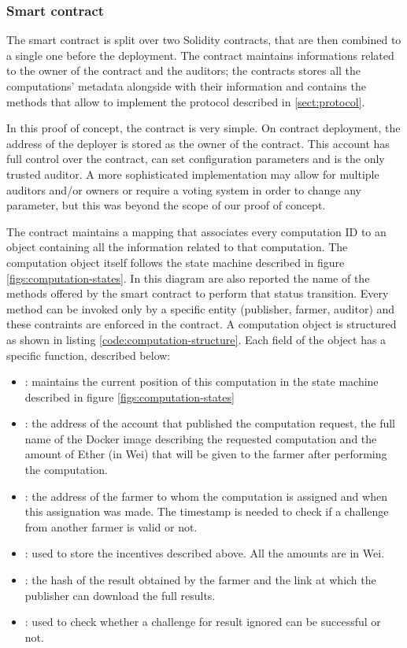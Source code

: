 \subsubsection{Smart contract}
The smart contract is split over two Solidity contracts, that are then combined to a single one before the deployment. The  contract maintains informations related to the owner of the contract and the auditors; the  contracts stores all the computations' metadata alongside with their information and contains the methods that allow to implement the protocol described in \ref{sect:protocol}.

In this proof of concept, the  contract is very simple. On contract deployment, the address of the deployer is stored as the owner of the contract. This account has full control over the contract, can set configuration parameters and is the only trusted auditor. A more sophisticated implementation may allow for multiple auditors and/or owners or require a voting system in order to change any parameter, but this was beyond the scope of our proof of concept.

The contract  maintains a mapping that associates every computation ID to an object containing all the information related to that computation. The computation object itself follows the state machine described in figure \ref{figs:computation-states}. In this diagram are also reported the name of the methods offered by the smart contract to perform that status transition. Every method can be invoked only by a specific entity (publisher, farmer, auditor) and these contraints are enforced in the contract. A computation object is structured as shown in listing \ref{code:computation-structure}. Each field of the object has a specific function, described below:

\begin{itemize}
\item {}: maintains the current position of this computation in the state machine described in figure \ref{figs:computation-states}
\item {}: the address of the account that published the computation request, the full name of the Docker image describing the requested computation and the amount of Ether (in Wei) that will be given to the farmer after performing the computation.
\item {}: the address of the farmer to whom the computation is assigned and when this assignation was made. The timestamp is needed to check if a challenge from another farmer is valid or not.
\item {}: used to store the incentives described above. All the amounts are in Wei.
\item {}: the hash of the result obtained by the farmer and the link at which the publisher can download the full results.
\item {}: used to check whether a challenge for result ignored can be successful or not.
\end{itemize}

